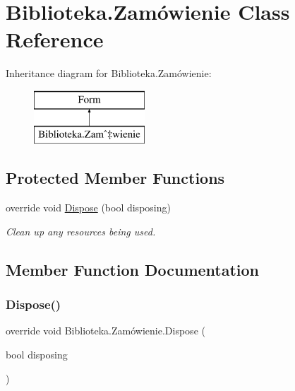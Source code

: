 \hypertarget{class_biblioteka_1_1_zam_xC3_xB3wienie}{}\section{Biblioteka.\+Zamówienie Class Reference}
\label{class_biblioteka_1_1_zam_xC3_xB3wienie}
Inheritance diagram for Biblioteka.\+Zamówienie\+:\begin{figure}[H]
\begin{center}
\leavevmode
\includegraphics[height=2.000000cm]{class_biblioteka_1_1_zam_xC3_xB3wienie}
\end{center}
\end{figure}
\subsection*{Protected Member Functions}
\begin{DoxyCompactItemize}
\item 
override void \hyperlink{class_biblioteka_1_1_zam_xC3_xB3wienie_a1398f1e24c48fa539f5afe91527eec6f}{Dispose} (bool disposing)
\begin{DoxyCompactList}\small\item\em Clean up any resources being used. \end{DoxyCompactList}\end{DoxyCompactItemize}


\subsection{Member Function Documentation}
\mbox{\label{class_biblioteka_1_1_zam_xC3_xB3wienie_a1398f1e24c48fa539f5afe91527eec6f}} 
\subsubsection{\texorpdfstring{Dispose()}{Dispose()}}
{\footnotesize\ttfamily override void Biblioteka.\+Zamówienie.\+Dispose (\begin{DoxyParamCaption}\item[{bool}]{disposing }\end{DoxyParamCaption})\hspace{0.3cm}{\ttfamily [protected]}}



